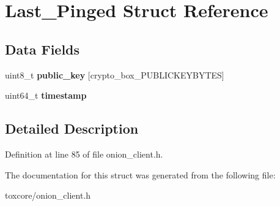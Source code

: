 \hypertarget{struct_last___pinged}{\section{Last\+\_\+\+Pinged Struct Reference}
\label{struct_last___pinged}
}
\subsection*{Data Fields}
\begin{DoxyCompactItemize}
\item 
\hypertarget{struct_last___pinged_aaa806bb1136fb3d4b5d8d8970b596ff7}{uint8\+\_\+t {\bfseries public\+\_\+key} \mbox{[}crypto\+\_\+box\+\_\+\+P\+U\+B\+L\+I\+C\+K\+E\+Y\+B\+Y\+T\+E\+S\mbox{]}}\label{struct_last___pinged_aaa806bb1136fb3d4b5d8d8970b596ff7}

\item 
\hypertarget{struct_last___pinged_a465bef81f6478756e5443025b1f2ddfa}{uint64\+\_\+t {\bfseries timestamp}}\label{struct_last___pinged_a465bef81f6478756e5443025b1f2ddfa}

\end{DoxyCompactItemize}


\subsection{Detailed Description}


Definition at line 85 of file onion\+\_\+client.\+h.



The documentation for this struct was generated from the following file\+:\begin{DoxyCompactItemize}
\item 
toxcore/onion\+\_\+client.\+h\end{DoxyCompactItemize}
